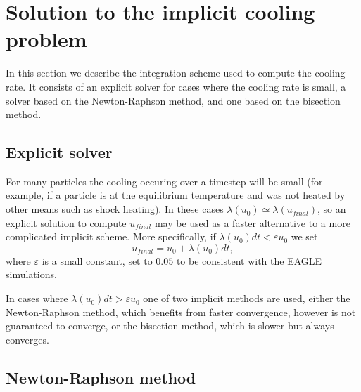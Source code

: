 \documentclass[fleqn, usenatbib, useAMS, a4paper]{mnras}
\begin{document}
\section{Solution to the implicit cooling problem}

In this section we describe the integration scheme used to compute the 
cooling rate. It consists of an explicit solver for cases where the 
cooling rate is small, a solver based on the Newton-Raphson method, and
one based on the bisection method. 

\subsection{Explicit solver}

For many particles the cooling occuring over a timestep will be small 
(for example, if a particle is at the equilibrium temperature and was not
heated by other means such as shock heating). In these cases $\lambda(u_0)
\simeq \lambda(u_{final})$, so an explicit solution to compute $u_{final}$
may be used as a faster alternative to a more complicated implicit scheme. 
More specifically, if $\lambda(u_0) dt < \varepsilon u_0$ we set
\begin{equation}
u_{final} = u_0 + \lambda(u_0) dt,
\end{equation}
where $\varepsilon$ is a small constant, set to $0.05$ to be consistent 
with the EAGLE simulations. 

In cases where $\lambda(u_0) dt > \varepsilon u_0$ one of two implicit 
methods are used, either the Newton-Raphson method, which benefits from
faster convergence, however is not guaranteed to converge, or the 
bisection method, which is slower but always converges. 

\subsection{Newton-Raphson method}
\end{document}
